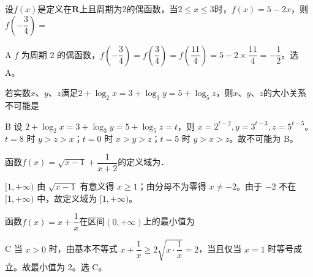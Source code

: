 


\begin{question}
设$f(x)$是定义在$\mathbf{R}$上且周期为2的偶函数，当$2\le x\le 3$时，$f(x)=5-2x$，则$f\left( -\dfrac{3}{4} \right)=$\choiceBox
{}
\end{question}
\begin{answer}{A}
$f$ 为周期 $2$ 的偶函数，$f\left(-\dfrac34\right)=f\left(\dfrac34\right)=f\left(\dfrac{11}{4}\right)=5-2\times\dfrac{11}{4}=-\dfrac12$。选 A。
\end{answer}

\begin{question}
若实数$x$、$y$、$z$满足$2+\log_2x=3+\log_3y=5+\log_5z$，则$x$、$y$、$z$的大小关系不可能是\choiceBox



\end{question}
\begin{answer}{B}
设 $2+\log_2x=3+\log_3y=5+\log_5z=t$，则 $x=2^{t-2},y=3^{t-3},z=5^{t-5}$。$t=8$ 时 $y>z>x$；$t=0$ 时 $x>y>z$；$t=5$ 时 $y>x>z$。故不可能为 B。
\end{answer}

\begin{question}[GPT生成]
函数$f(x)=\sqrt{x-1}+\dfrac{1}{x+2}$的定义域为\blank{3cm}．
\end{question}
\begin{answer}{$[1,+\infty)$}
由 $\sqrt{x-1}$ 有意义得 $x\ge1$；由分母不为零得 $x\ne-2$。由于 $-2$ 不在 $[1,+\infty)$ 中，故定义域为 $[1,+\infty)$。
\end{answer}



\begin{question}[GPT生成]
函数$f(x)=x+\dfrac{1}{x}$在区间$(0,+\infty)$上的最小值为\choiceBox
{}
\end{question}
\begin{answer}{C}
当 $x>0$ 时，由基本不等式 $x+\dfrac1x\ge2\sqrt{x\cdot\dfrac1x}=2$，当且仅当 $x=1$ 时等号成立。故最小值为 $2$。选 C。
\end{answer}


